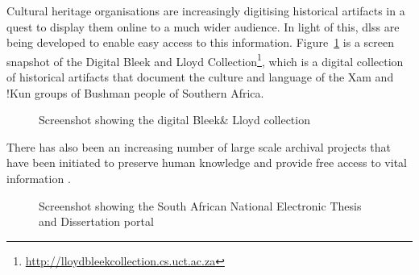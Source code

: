 Cultural heritage organisations are increasingly digitising historical artifacts
in a quest to display them online to a much wider audience. In light of this,
\glspl{dls}  are being developed to enable easy access to this
information. Figure~\ref{fig:background:digital-libraries:uct-digital-lloydbleekcollection} is a
screen snapshot of the Digital Bleek and Lloyd
Collection\footnote{\url{http://lloydbleekcollection.cs.uct.ac.za}}, which is a
digital collection of historical artifacts that document the culture and
language of the \textbar Xam and !Kun groups of Bushman people of Southern
Africa.

\begin{figure}
  \centering
\caption{Screenshot showing the digital Bleek\& Lloyd collection}
\label{fig:background:digital-libraries:uct-digital-lloydbleekcollection}
\end{figure}


There has also been an increasing number of large scale archival projects that
have been initiated to preserve human knowledge and provide free access to vital
information \citep{Hart1992}.

\begin{figure}
 \centering
  \caption[Screenshot showing the South African NETD portal]{Screenshot showing the South African National Electronic Thesis and Dissertation portal}
  \label{fig:background:digital-libraries:sa-netd-portal}

\end{figure}

